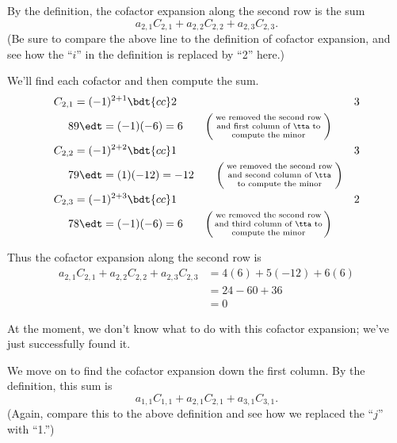 {By the definition, the cofactor expansion along the second row is the sum 
\[
a_{2,1}C_{2,1} + a_{2,2}C_{2,2} + a_{2,3}C_{2,3}.
\]
(Be sure to compare the above line to the definition of cofactor expansion, and see how the ``$i$'' in the definition is replaced by ``2'' here.)

We'll find each cofactor and then compute the sum.
\begin{align*}
C_{2,1} &= (-1)^{2+1}\bdt{cc}2&3\\8&9\edt  = (-1)(-6) = 6 \tag*{$ \left(\parbox{100pt}{\centering\scriptsize we removed the second row and first column of \tta\ to compute the minor}\right)$}\\
C_{2,2} &= (-1)^{2+2}\bdt{cc}1&3\\7&9\edt = (1)(-12) = -12 \tag*{$\left(\parbox{100pt}{\centering\scriptsize we removed the second row and second column of \tta\ to compute the minor}\right)$}\\
C_{2,3} &= (-1)^{2+3}\bdt{cc}1&2\\7&8\edt = (-1)(-6) = 6 \tag*{$\left(\parbox{100pt}{\centering\scriptsize we removed  the second row and third column of \tta\ to compute the minor}\right)$}
\end{align*}


Thus the cofactor expansion along the second row is
\begin{align*}
a_{2,1}C_{2,1} + a_{2,2}C_{2,2} + a_{2,3}C_{2,3} &= 4(6) + 5(-12) + 6(6) \\
&= 24-60+36\\
&= 0
\end{align*}

At the moment, we don't know what to do with this cofactor expansion; we've just successfully found it.

We move on to find the cofactor expansion down the first column. By the definition, this sum is
\[
a_{1,1}C_{1,1} + a_{2,1}C_{2,1} + a_{3,1}C_{3,1}.
\]
(Again, compare this to the above definition and see how we replaced the ``$j$'' with ``1.'')

}
